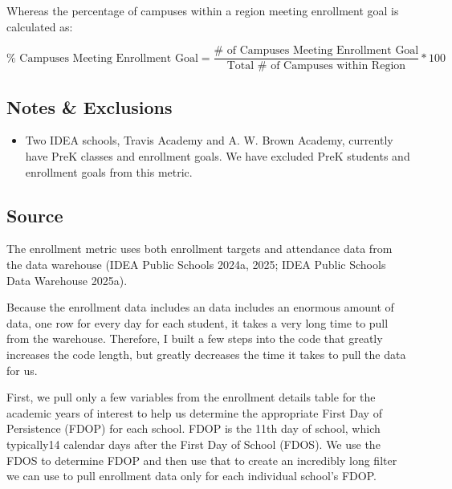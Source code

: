 \documentclass[
  letterpaper,
  DIV=11,
  numbers=noendperiod]{scrreprt}
\providecommand{\tightlist}{%
  \setlength{\itemsep}{0pt}\setlength{\parskip}{0pt}}
\begin{document}
Whereas the percentage of campuses within a region meeting enrollment
goal is calculated as:

\[{\% \text{ Campuses Meeting Enrollment Goal}} = \frac{\# \text{ of Campuses Meeting Enrollment Goal}}{\text{Total } \# \text{ of Campuses within Region}}*100\]

\subsection{Notes \& Exclusions}\label{notes-exclusions-6}

\begin{itemize}
\tightlist
\item
  Two IDEA schools, Travis Academy and A. W. Brown Academy, currently
  have PreK classes and enrollment goals. We have excluded PreK students
  and enrollment goals from this metric.
\end{itemize}

\subsection{Source}\label{sec-Enrollsource}

The enrollment metric uses both enrollment targets and attendance data
from the data warehouse (IDEA Public Schools 2024a, 2025; IDEA Public
Schools Data Warehouse 2025a).

Because the enrollment data includes an data includes an enormous amount
of data, one row for every day for each student, it takes a very long
time to pull from the warehouse. Therefore, I built a few steps into the
code that greatly increases the code length, but greatly decreases the
time it takes to pull the data for us.

First, we pull only a few variables from the enrollment details table
for the academic years of interest to help us determine the appropriate
First Day of Persistence (FDOP) for each school. FDOP is the 11th day of
school, which typically14 calendar days after the First Day of School
(FDOS). We use the FDOS to determine FDOP and then use that to create an
incredibly long filter we can use to pull enrollment data only for each
individual school's FDOP.
\end{document}
